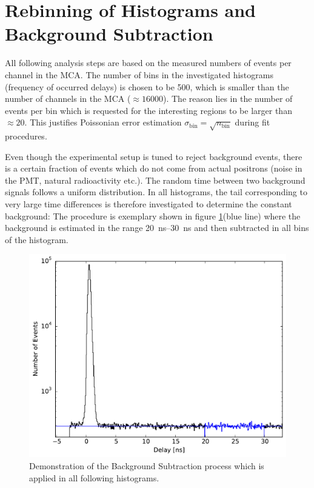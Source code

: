\documentclass[
	paper=A4,
	parskip=full,
	chapterprefix=true,
	11pt,
	headings=normal,
	bibliography=totoc,
	listof=totoc,
	titlepage=on,
]{scrreprt}
\begin{document}
\section{Rebinning of Histograms and Background Subtraction}
All following analysis steps are based on the measured numbers of events per channel in the MCA. The number of bins in the investigated histograms (frequency of occurred delays) is chosen to be \num{500}, which is smaller than the number of channels in the MCA ($\approx \num{16000}$). The reason lies in the number of events per bin which is requested for the interesting regions to be larger than $\approx 20$. This justifies Poissonian error estimation $\sigma_\textrm{bin}=\sqrt{n_\textrm{bin}}$ during fit procedures.

Even though the experimental setup is tuned to reject background events, there is a certain fraction of events which do not come from actual positrons (noise in the PMT, natural radioactivity etc.). The random time between two background signals follows a uniform distribution. In all histograms, the tail corresponding to very large time differences is therefore investigated to determine the constant background: The procedure is exemplary shown in figure \ref{fig:resolution_background}(blue line) where the background is estimated in the range \SIrange{20}{30}{\nano\second} and then subtracted in all bins of the histogram. 

\begin{figure}
	\centering
	\includegraphics{resolution_background}
	\caption{Demonstration of the Background Subtraction process which is applied in all following histograms.}
	\label{fig:resolution_background}
\end{figure}
\end{document}
